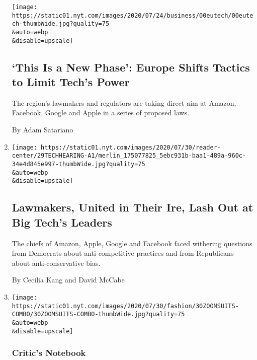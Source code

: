 \begin{enumerate}
  \texttt{[image: https://static01.nyt.com/images/2020/07/24/business/00eutech/00eutech-thumbWide.jpg?quality=75\\\&auto=webp\\\&disable=upscale]}

  \hypertarget{this-is-a-new-phase-europe-shifts-tactics-to-limit-techs-power}{%
  \subsection{`This Is a New Phase': Europe Shifts Tactics to Limit
  Tech's
  Power}\label{this-is-a-new-phase-europe-shifts-tactics-to-limit-techs-power}}

  The region's lawmakers and regulators are taking direct aim at Amazon,
  Facebook, Google and Apple in a series of proposed laws.

  By Adam Satariano
\item
  \href{/2020/07/29/technology/big-tech-hearing-apple-amazon-facebook-google.html}{}

  \texttt{[image: https://static01.nyt.com/images/2020/07/30/reader-center/29TECHHEARING-A1/merlin\_175077825\_5ebc931b-baa1-489a-960c-34e4d845e997-thumbWide.jpg?quality=75\\\&auto=webp\\\&disable=upscale]}

  \hypertarget{lawmakers-united-in-their-ire-lash-out-at-big-techs-leaders}{%
  \subsection{Lawmakers, United in Their Ire, Lash Out at Big Tech's
  Leaders}\label{lawmakers-united-in-their-ire-lash-out-at-big-techs-leaders}}

  The chiefs of Amazon, Apple, Google and Facebook faced withering
  questions from Democrats about anti-competitive practices and from
  Republicans about anti-conservative bias.

  By Cecilia Kang and David McCabe
\item
  \href{/2020/07/29/style/Bezos-zuckerberg-cook-pichai-testimony-suits.html}{}

  \texttt{[image: https://static01.nyt.com/images/2020/07/30/fashion/30ZOOMSUITS-COMBO/30ZOOMSUITS-COMBO-thumbWide.jpg?quality=75\\\&auto=webp\\\&disable=upscale]}

  \hypertarget{critics-notebook}{%
  \subsubsection{Critic's Notebook}\label{critics-notebook}}

  \hypertarget{titans-of-tech-testify-in-their-trust-me-suits}{%
}
\end{enumerate}
